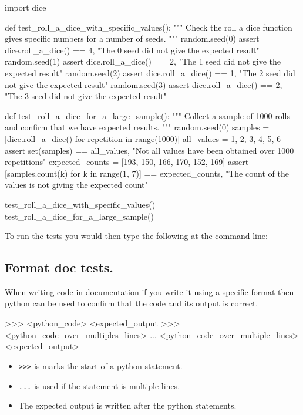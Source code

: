 \begin{pyin}
import dice


def test_roll_a_dice_with_specific_values():
    """
    Check the roll a dice function gives specific numbers for a number of seeds.
    """
    random.seed(0)
    assert dice.roll_a_dice() == 4, "The 0 seed did not give the expected result"
    random.seed(1)
    assert dice.roll_a_dice() == 2, "The 1 seed did not give the expected result"
    random.seed(2)
    assert dice.roll_a_dice() == 1, "The 2 seed did not give the expected result"
    random.seed(3)
    assert dice.roll_a_dice() == 2, "The 3 seed did not give the expected result"


def test_roll_a_dice_for_a_large_sample():
    """
    Collect a sample of 1000 rolls and confirm that we have expected results.
    """
    random.seed(0)
    samples = [dice.roll_a_dice() for repetition in range(1000)]
    all_values = {1, 2, 3, 4, 5, 6}
    assert set(samples) == all_values, "Not all values have been obtained over 1000 repetitions"
    expected_counts = [193, 150, 166, 170, 152, 169]
    assert [samples.count(k) for k in range(1, 7)] == expected_counts, "The count of the values is not giving the expected count"

test_roll_a_dice_with_specific_values()
test_roll_a_dice_for_a_large_sample()
\end{pyin}


To run the tests you would then type the following at the command line:



\subsection{Format doc tests.}

When writing code in documentation if you write it using a specific format then
python can be used to confirm that the code and its output is correct.


\begin{pyin}
>>> <python_code>
<expected_output
>>> <python_code_over_multiples_lines>
... <python_code_over_multiple_lines>
<expected_output>
\end{pyin}

\begin{itemize}
\item 

\texttt{>>>} is marks the start of a python statement.

\item 

\texttt{...} is used if the statement is multiple lines.

\item 

The expected output is written after the python statements.

\end{itemize}


